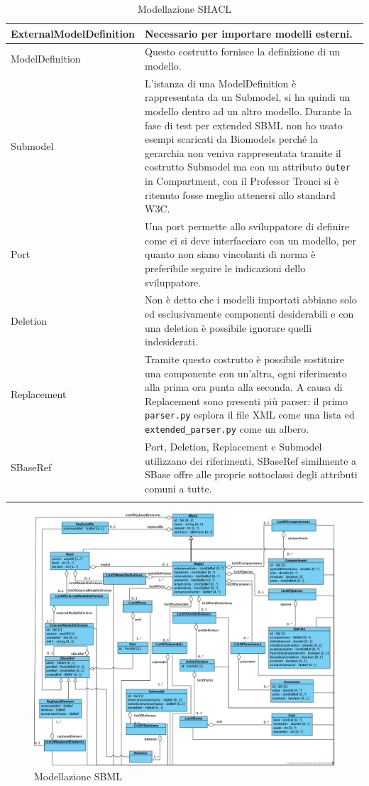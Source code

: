 \documentclass{article}
\begin{document}
\begin{longtable}{p{}p{}}
    \hline
    ExternalModelDefinition &  Necessario per importare modelli esterni. \\
    \hline
    ModelDefinition & Questo costrutto fornisce la definizione di un modello. \\ 
    \hline
    Submodel & L'istanza di una ModelDefinition è rappresentata da un Submodel, si ha quindi un modello dentro ad un altro modello. Durante la fase di test per extended SBML non ho usato esempi scaricati da Biomodels perché la gerarchia non veniva rappresentata tramite il costrutto Submodel ma con un attributo \texttt{outer} in Compartment, con il Professor Tronci si è ritenuto fosse meglio attenersi allo standard W3C. \\ 
    \hline
    Port & Una port permette allo sviluppatore di definire come ci si deve interfacciare con un modello, per quanto non siano vincolanti di norma è preferibile seguire le indicazioni dello sviluppatore. \\ 
    \hline
    Deletion & Non è detto che i modelli importati abbiano solo ed esclusivamente componenti desiderabili e con una deletion è possibile ignorare quelli indesiderati. \\
    \hline
    Replacement & Tramite questo costrutto è possibile sostituire una componente con un'altra, ogni riferimento alla prima ora punta alla seconda. A causa di Replacement sono presenti più parser: il primo \texttt{parser.py} esplora il file XML come una lista ed \texttt{extended\_parser.py} come un albero. \\
    \hline
    SBaseRef & Port, Deletion, Replacement e Submodel utilizzano dei riferimenti, SBaseRef similmente a SBase offre alle proprie sottoclassi degli attributi comuni a tutte. \\
    \hline

    \caption{Modellazione SHACL}
    \label{tab:modellazione}
\end{longtable}

\begin{figure}
    \caption{Modellazione SBML}
    \label{fig:diagram}
    \includegraphics[scale=0.6]{images/diagram.png}
\end{figure}
\end{document}
